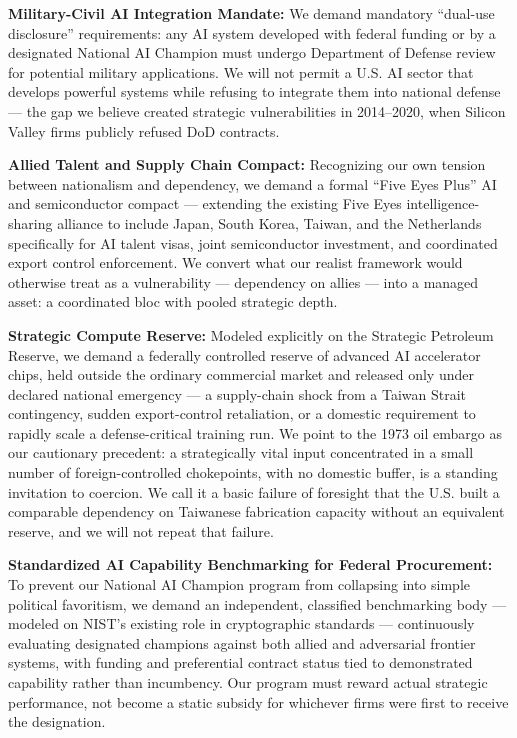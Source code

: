 \textbf{Military-Civil AI Integration Mandate:} We demand mandatory
``dual-use disclosure'' requirements: any AI system developed with
federal funding or by a designated National AI Champion must undergo
Department of Defense review for potential military applications. We
will not permit a U.S. AI sector that develops powerful systems while
refusing to integrate them into national defense --- the gap we believe
created strategic vulnerabilities in 2014--2020, when Silicon Valley
firms publicly refused DoD contracts.

\textbf{Allied Talent and Supply Chain Compact:} Recognizing our own
tension between nationalism and dependency, we demand a formal ``Five
Eyes Plus'' AI and semiconductor compact --- extending the existing Five
Eyes intelligence-sharing alliance to include Japan, South Korea,
Taiwan, and the Netherlands specifically for AI talent visas, joint
semiconductor investment, and coordinated export control enforcement. We
convert what our realist framework would otherwise treat as a
vulnerability --- dependency on allies --- into a managed asset: a
coordinated bloc with pooled strategic depth.

\textbf{Strategic Compute Reserve:} Modeled explicitly on the Strategic
Petroleum Reserve, we demand a federally controlled reserve of advanced
AI accelerator chips, held outside the ordinary commercial market and
released only under declared national emergency --- a supply-chain shock
from a Taiwan Strait contingency, sudden export-control retaliation, or
a domestic requirement to rapidly scale a defense-critical training run.
We point to the 1973 oil embargo as our cautionary precedent: a
strategically vital input concentrated in a small number of
foreign-controlled chokepoints, with no domestic buffer, is a standing
invitation to coercion. We call it a basic failure of foresight that the
U.S. built a comparable dependency on Taiwanese fabrication capacity
without an equivalent reserve, and we will not repeat that failure.

\textbf{Standardized AI Capability Benchmarking for Federal
Procurement:} To prevent our National AI Champion program from
collapsing into simple political favoritism, we demand an independent,
classified benchmarking body --- modeled on NIST's existing role in
cryptographic standards --- continuously evaluating designated champions
against both allied and adversarial frontier systems, with funding and
preferential contract status tied to demonstrated capability rather than
incumbency. Our program must reward actual strategic performance, not
become a static subsidy for whichever firms were first to receive the
designation.

